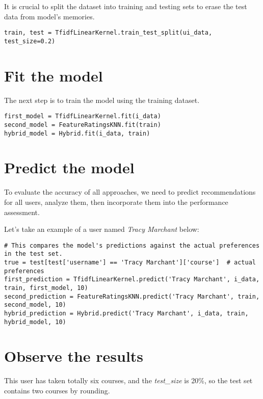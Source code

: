 It is crucial to split the dataset into training and testing sets to erase the 
test data from model's memories.

\begin{verbatim}
train, test = TfidfLinearKernel.train_test_split(ui_data, test_size=0.2)
\end{verbatim}

\section{Fit the model}

The next step is to train the model using the training dataset.

\begin{verbatim}
first_model = TfidfLinearKernel.fit(i_data)
second_model = FeatureRatingsKNN.fit(train)
hybrid_model = Hybrid.fit(i_data, train)
\end{verbatim}

\section{Predict the model}

To evaluate the accuracy of all approaches, we need to predict recommendations for all 
users, analyze them, then incorporate them into the performance assessment.

Let's take an example of a user named \textit{Tracy Marchant} below:

\begin{verbatim}
# This compares the model's predictions against the actual preferences in the test set.
true = test[test['username'] == 'Tracy Marchant']['course']  # actual preferences
first_prediction = TfidfLinearKernel.predict('Tracy Marchant', i_data, train, first_model, 10)
second_prediction = FeatureRatingsKNN.predict('Tracy Marchant', train, second_model, 10)
hybrid_prediction = Hybrid.predict('Tracy Marchant', i_data, train, hybrid_model, 10)
\end{verbatim}

\section{Observe the results}

This user has taken totally six courses, and the \textit{test\_size} is 20\%, 
so the test set contains two courses by rounding.

